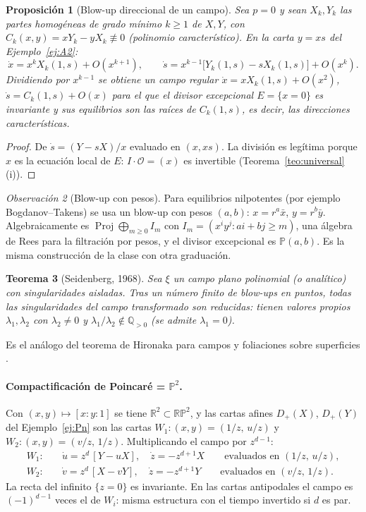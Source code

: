 \documentclass[11pt,a4paper]{article}
\newcommand{\Proj}{\operatorname{Proj}}
\newcommand{\PP}{\mathbb{P}}
\newcommand{\cO}{\mathcal{O}}
\newcommand{\RR}{\mathbb{R}}
\theoremstyle{plain}
\newtheorem{teorema}{Teorema}[section]
\newtheorem{proposicion}[teorema]{Proposición}
\theoremstyle{definition}
\theoremstyle{remark}
\newtheorem{observacion}[teorema]{Observación}
\begin{document}
\begin{proposicion}[Blow-up direccional de un campo]\label{prop:campo}
Sea $p=0$ y sean $X_k,Y_k$ las partes homogéneas de grado mínimo $k\ge1$ de $X,Y$, con $C_k(x,y)=xY_k-yX_k\not\equiv0$ (polinomio característico). En la carta $y=xs$ del Ejemplo~\ref{ej:A2}:
\[
\dot x=x^kX_k(1,s)+O(x^{k+1}),\qquad \dot s=x^{k-1}\big[Y_k(1,s)-sX_k(1,s)\big]+O(x^k).
\]
Dividiendo por $x^{k-1}$ se obtiene un campo regular $\dot x=xX_k(1,s)+O(x^2)$, $\dot s=C_k(1,s)+O(x)$ para el que el divisor excepcional $E=\{x=0\}$ es invariante y sus equilibrios son las raíces de $C_k(1,s)$, es decir, las \emph{direcciones características}.
\end{proposicion}

\begin{proof}
De $\dot s=(Y-sX)/x$ evaluado en $(x,xs)$. La división es legítima porque $x$ es la ecuación local de $E$: $I\cdot\cO=(x)$ es invertible (Teorema~\ref{teo:universal}(i)).
\end{proof}

\begin{observacion}[Blow-up con pesos]\label{obs:pesos}
Para equilibrios nilpotentes (por ejemplo Bogdanov--Takens) se usa un blow-up con pesos $(a,b)$: $x=r^a\bar x$, $y=r^b\bar y$. Algebraicamente es $\Proj\bigoplus_{m\ge0}I_m$ con $I_m=(x^iy^j: ai+bj\ge m)$, una álgebra de Rees para la filtración por pesos, y el divisor excepcional es $\PP(a,b)$. Es la misma construcción de la clase con otra graduación.
\end{observacion}

\begin{teorema}[Seidenberg, 1968]\label{teo:seidenberg}
Sea $\xi$ un campo plano polinomial (o analítico) con singularidades aisladas. Tras un número finito de blow-ups en puntos, todas las singularidades del campo transformado son \emph{reducidas}: tienen valores propios $\lambda_1,\lambda_2$ con $\lambda_2\neq0$ y $\lambda_1/\lambda_2\notin\mathbb Q_{>0}$ (se admite $\lambda_1=0$).
\end{teorema}

Es el análogo del teorema de Hironaka para campos y foliaciones sobre superficies \cite{Sei}.

\paragraph{Compactificación de Poincaré = $\PP^2$.} Con $(x,y)\mapsto[x:y:1]$ se tiene $\RR^2\subset\RR\PP^2$, y las cartas afines $D_+(X)$, $D_+(Y)$ del Ejemplo~\ref{ej:Pn} son las cartas $W_1\colon(x,y)=(1/z,\,u/z)$ y $W_2\colon(x,y)=(v/z,\,1/z)$. Multiplicando el campo por $z^{d-1}$:
\begin{align*}
W_1:&\quad \dot u=z^d\,[Y-uX],\quad \dot z=-z^{d+1}X\qquad\text{evaluados en }(1/z,\,u/z),\\
W_2:&\quad \dot v=z^d\,[X-vY],\quad \dot z=-z^{d+1}Y\qquad\text{evaluados en }(v/z,\,1/z).
\end{align*}
La recta del infinito $\{z=0\}$ es invariante. En las cartas antipodales el campo es $(-1)^{d-1}$ veces el de $W_i$: misma estructura con el tiempo invertido si $d$ es par.
\end{document}
